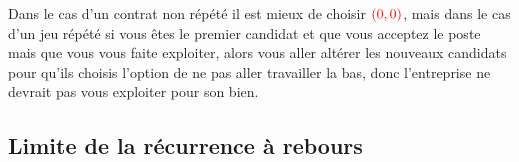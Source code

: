 \begin{center}
\end{center}
Dans le cas d'un contrat non répété il est mieux de choisir $\textcolor{red}{(0,0)}$, mais dans le cas d'un jeu répété si vous êtes le premier candidat et que vous acceptez le poste mais que vous vous faite exploiter, alors vous aller altérer les nouveaux candidats pour qu'ils choisis l'option de ne pas aller travailler la bas, donc l'entreprise ne devrait pas vous exploiter pour son bien.\\

\subsection{Limite de la récurrence à rebours}

